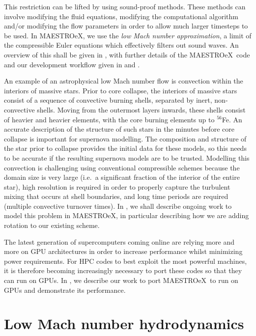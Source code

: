 \documentclass[a4paper]{jpconf}
\newcommand{\maestroex}{{\sffamily MAESTROeX}}
\begin{document}
This restriction can be lifted by using sound-proof methods. These methods can involve modifying the fluid equations, modifying the computational algorithm and/or modifying the flow parameters in order to allow much larger timesteps to be used. In \maestroex, we use the \emph{low Mach number approximation}, a limit of the compressible Euler equations which effectively filters out sound waves. An overview of this shall be given in , with further details of the \maestroex~code and our development workflow given in  and .  

An example of an astrophysical low Mach number flow is convection within the interiors of massive stars. Prior to core collapse, the interiors of massive stars consist of a sequence of convective burning shells, separated by inert, non-convective shells. Moving from the outermost layers inwards, these shells consist of heavier and heavier elements, with the core burning elements up to ${}^{56}$Fe. An accurate description of the structure of such stars in the minutes before core collapse is important for supernova modelling. The composition and structure of the star prior to collapse provides the initial data for these models, so this needs to be accurate if the resulting supernova models are to be trusted. Modelling this convection is challenging using conventional compressible schemes because the domain size is very large (i.e.~a significant fraction of the interior of the entire star), high resolution is required in order to properly capture the turbulent mixing that occurs at shell boundaries, and long time periods are required (multiple convective turnover times). In , we shall describe ongoing work to model this problem in \maestroex, in particular describing how we are adding rotation to our existing scheme. 

The latest generation of supercomputers coming online are relying more and more on GPU architectures in order to increase performance whilst minimizing power requirements. For HPC codes to best exploit the most powerful machines, it is therefore becoming increasingly necessary to port these codes so that they can run on GPUs. In , we describe our work to port \maestroex~to run on GPUs and demonstrate its performance.


\section{Low Mach number hydrodynamics} \label{sec:low_mach_hydro}
\end{document}
